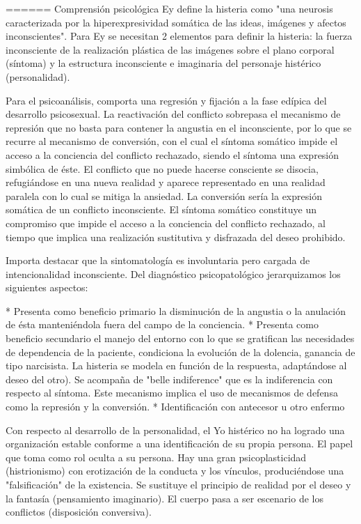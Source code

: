 \documentclass{scrbook}
\begin{document}
====== Comprensión psicológica
Ey define la histeria como "una neurosis caracterizada por la hiperexpresividad somática de las ideas, imágenes y afectos inconscientes". Para Ey se necesitan 2 elementos para definir la histeria: la fuerza inconsciente de la realización plástica de las imágenes sobre el plano corporal (síntoma) y la estructura inconsciente e imaginaria del personaje histérico (personalidad).

Para el psicoanálisis, comporta una regresión y fijación a la fase edípica del desarrollo psicosexual. La reactivación del conflicto sobrepasa el mecanismo de represión que no basta para contener la angustia en el inconsciente, por lo que se recurre al mecanismo de conversión, con el cual el síntoma somático impide el acceso a la conciencia del conflicto rechazado, siendo el síntoma una expresión simbólica de éste. El conflicto que no puede hacerse consciente se disocia, refugiándose en una nueva realidad y aparece representado en una realidad paralela con lo cual se mitiga la ansiedad. La conversión sería la expresión somática de un conflicto inconsciente. El síntoma somático constituye un compromiso que impide el acceso a la conciencia del conflicto rechazado, al tiempo que implica una realización sustitutiva y disfrazada del deseo prohibido.

Importa destacar que la sintomatología es involuntaria pero cargada de intencionalidad inconsciente. Del diagnóstico psicopatológico jerarquizamos los siguientes aspectos:

* Presenta como beneficio primario la disminución de la angustia o la anulación de ésta manteniéndola fuera del campo de la conciencia.
* Presenta como beneficio secundario el manejo del entorno con lo que se gratifican las necesidades de dependencia de la paciente, condiciona la evolución de la dolencia, ganancia de tipo narcisista. La histeria se modela en función de la respuesta, adaptándose al deseo del otro). Se acompaña de "belle indiference" que es la indiferencia con respecto al síntoma. Este mecanismo implica el uso de mecanismos de defensa como la represión y la conversión.
* Identificación con antecesor u otro enfermo

Con respecto al desarrollo de la personalidad, el Yo histérico no ha logrado una organización estable conforme a una identificación de su propia persona. El papel que toma como rol oculta a su persona. Hay una gran psicoplasticidad (histrionismo) con erotización de la conducta y los vínculos, produciéndose una "falsificación" de la existencia. Se sustituye el principio de realidad por el deseo y la fantasía (pensamiento imaginario). El cuerpo pasa a ser escenario de los conflictos (disposición conversiva).
\end{document}
